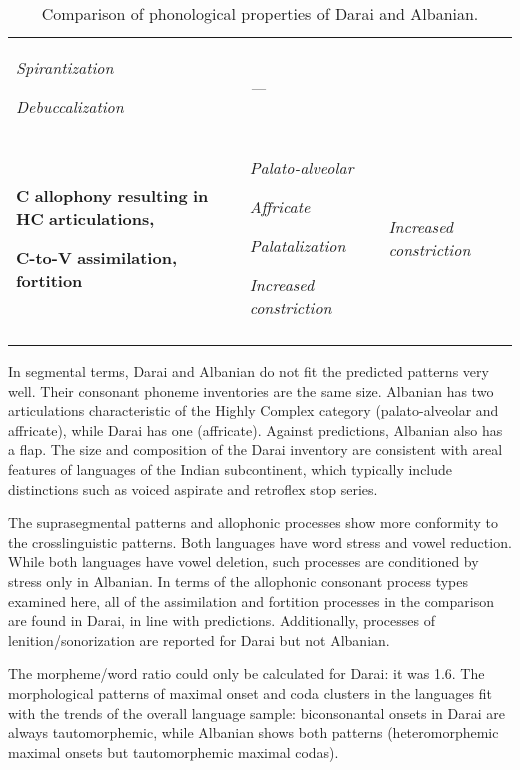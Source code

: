 \begin{table}
\begin{tabularx}{\textwidth}{XXX}
{ \textit{Spirantization}}

 \textit{Debuccalization} & \textit{—}\\
{ \textbf{C} \textbf{allophony} \textbf{resulting} \textbf{in} \textbf{HC} \textbf{articulations,} }

 \textbf{C-to-V} \textbf{assimilation,} \textbf{fortition} & { \textit{Palato-alveolar}}

{ \textit{Affricate}}

{ \textit{Palatalization}}

 \textit{Increased} \textit{constriction} & \textit{Increased} \textit{constriction}\\
\lspbottomrule
\end{tabularx}
\caption{\label{8.6}Comparison of phonological properties of Darai and Albanian.}
\end{table}




  In segmental terms, Darai and Albanian do not fit the predicted patterns very well. Their consonant phoneme inventories are the same size. Albanian has two articulations characteristic of the Highly Complex category (palato-alveolar and affricate), while Darai has one (affricate). Against predictions, Albanian also has a flap. The size and composition of the Darai inventory are consistent with areal features of languages of the Indian subcontinent, which typically include distinctions such as voiced aspirate and retroflex stop series.



  The suprasegmental patterns and allophonic processes show more conformity to the crosslinguistic patterns. Both languages have word stress and vowel reduction. While both languages have vowel deletion, such processes are conditioned by stress only in Albanian. In terms of the allophonic consonant process types examined here, all of the assimilation and fortition processes in the comparison are found in Darai, in line with predictions. Additionally, processes of lenition/sonorization are reported for Darai but not Albanian.



  The morpheme/word ratio could only be calculated for Darai: it was 1.6. The morphological patterns of maximal onset and coda clusters in the languages fit with the trends of the overall language sample: biconsonantal onsets in Darai are always tautomorphemic, while Albanian shows both patterns (heteromorphemic maximal onsets but tautomorphemic maximal codas).



